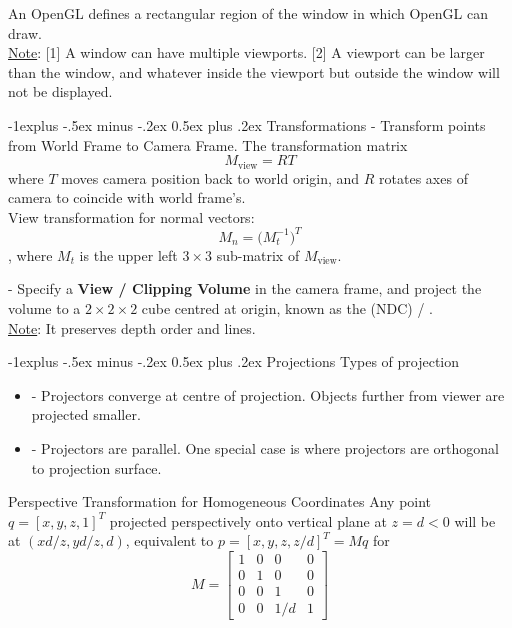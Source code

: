 \documentclass[10pt,landscape,letterpaper]{article}
\makeatletter
\renewcommand{\subsection}{\@startsection{subsection}{2}{0mm}%
                                {-1explus -.5ex minus -.2ex}%
                                {0.5ex plus .2ex}%
                                {\sffamily\normalsize\itshape}}
\makeatother
\begin{document}
\begin{multicols}{3}
\smallskip

An OpenGL  defines a rectangular region of the window in which OpenGL can draw.
\\
\underline{Note}: [1] A window can have multiple viewports. [2] A viewport can be larger than the window, and whatever inside the viewport but outside the window will not be displayed.


\subsection{Transformations}
 - Transform points from World Frame to Camera Frame. The transformation matrix
\[
M_\text{view} = RT
\]
where $T$ moves camera position back to world origin, and $R$ rotates axes of camera to coincide with world frame's.
\\
View transformation for normal vectors:
\[
M_n = \big( M_t^{-1} \big)^T
\]
, where $M_t$ is the upper left $3 \times 3$ sub-matrix of $M_\text{view}$.

\smallskip

 - Specify a \textbf{View / Clipping Volume} in the camera frame, and project the volume to a $2 \times 2 \times 2$ cube centred at origin, known as the  (NDC) / .
\\
\underline{Note}: It preserves depth order and lines.


\subsection{Projections}
Types of projection
\begin{itemize}
    \item {} - Projectors converge at centre of projection. Objects further from viewer are projected smaller.
    \item {} - Projectors are parallel. One special case  is where projectors are orthogonal to projection surface.
\end{itemize}

Perspective Transformation for Homogeneous Coordinates
Any point $q = [x, y, z, 1]^T$ projected perspectively onto vertical plane at $z = d < 0$ will be at $(xd/z, yd/z, d)$, equivalent to $p = [x, y, z, z/d]^T = Mq$ for
\[
M = 
\begin{bmatrix}
1       & 0         &  0        & 0       \\
0       & 1         &  0        & 0       \\
0       & 0         &  1        & 0       \\
0       & 0         &  1/d      & 1
\end{bmatrix}
\]


\end{multicols}
\end{document}

